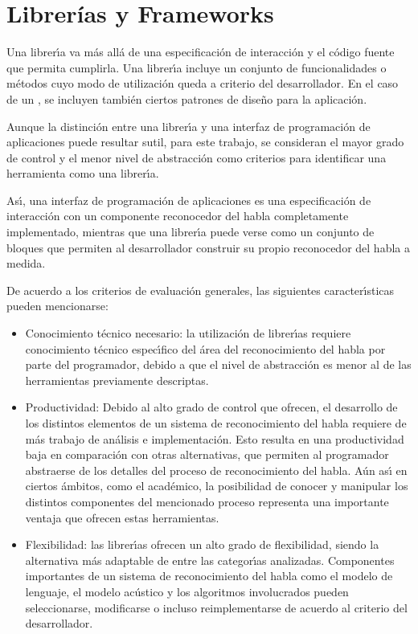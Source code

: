 \section{Librer\'ias y Frameworks}
\label{sec:librerias}

Una librer{\'\i}a va m\'as all\'a de una especificaci\'on de interacci\'on y el c\'odigo fuente que permita cumplirla.
Una librer{\'\i}a incluye un conjunto de funcionalidades o m\'etodos cuyo modo de utilizaci\'on queda a criterio
del desarrollador. En el caso de un , se incluyen tambi\'en ciertos patrones de dise\~no para la aplicaci\'on.

Aunque la distinci\'on entre una librer{\'\i}a y una interfaz de programaci\'on de aplicaciones puede resultar
sutil, para este trabajo, se consideran el mayor grado de control y el menor nivel de abstracci\'on
como criterios para identificar una herramienta como una librer{\'\i}a.

As{\'\i}, una interfaz de programaci\'on de aplicaciones es una especificaci\'on de interacci\'on con un componente
reconocedor del habla completamente implementado, mientras que una librer{\'\i}a puede verse como un conjunto
de bloques que permiten al desarrollador construir su propio reconocedor del habla a medida.

De acuerdo a los criterios de evaluaci\'on generales, las siguientes caracter{\'\i}sticas pueden mencionarse:

\begin{itemize}
 	\item Conocimiento t\'ecnico necesario: la utilizaci\'on de librer{\'\i}as requiere conocimiento t\'ecnico
 	espec{\'\i}fico del \'area del reconocimiento del habla por parte del programador, debido a que el nivel de
 	abstracci\'on es menor al de las herramientas previamente descriptas.
 	\item Productividad: Debido al alto grado de control que ofrecen, el desarrollo de los distintos
 	elementos de un sistema de reconocimiento del habla requiere de m\'as trabajo de an\'alisis e implementaci\'on.
 	Esto resulta en una productividad baja en comparaci\'on con otras alternativas, que permiten al
 	programador abstraerse de los detalles del proceso de reconocimiento del habla.
 	A\'un as{\'\i} en ciertos \'ambitos, como el acad\'emico, la posibilidad de conocer y manipular los distintos
 	componentes del mencionado proceso representa una importante ventaja que ofrecen estas herramientas.
 	\item Flexibilidad: las librer{\'\i}as ofrecen un alto grado de flexibilidad, siendo la alternativa
 	m\'as adaptable de entre las categor{\'\i}as analizadas. Componentes importantes de un sistema
 	de reconocimiento del habla como el modelo de lenguaje, el modelo ac\'ustico y los algoritmos involucrados
 	pueden seleccionarse, modificarse o incluso reimplementarse de acuerdo al criterio del desarrollador.
 \end{itemize}


